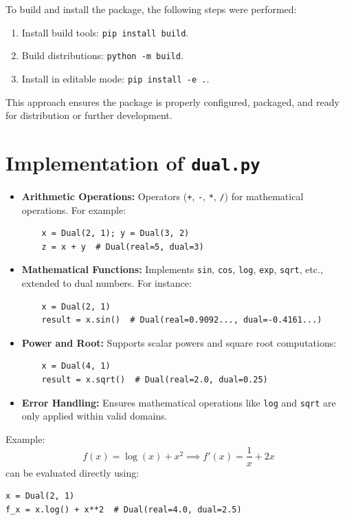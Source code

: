 \documentclass[a4paper,12pt]{article}
\begin{document}
To build and install the package, the following steps were performed:
\begin{enumerate}
    \item Install build tools: \texttt{pip install build}.
    \item Build distributions: \texttt{python -m build}.
    \item Install in editable mode: \texttt{pip install -e .}.
\end{enumerate}

This approach ensures the package is properly configured, packaged, and ready for distribution or further development.

\section{Implementation of \texttt{dual.py}}

\begin{itemize}
    \item \textbf{Arithmetic Operations:} Operators (\texttt{+}, \texttt{-}, \texttt{*}, \texttt{/}) for mathematical operations. For example:
    \begin{verbatim}
    x = Dual(2, 1); y = Dual(3, 2)
    z = x + y  # Dual(real=5, dual=3)
    \end{verbatim}
    \item \textbf{Mathematical Functions:} Implements \texttt{sin}, \texttt{cos}, \texttt{log}, \texttt{exp}, \texttt{sqrt}, etc., extended to dual numbers. For instance:
    \begin{verbatim}
    x = Dual(2, 1)
    result = x.sin()  # Dual(real=0.9092..., dual=-0.4161...)
    \end{verbatim}
    \item \textbf{Power and Root:} Supports scalar powers and square root computations:
    \begin{verbatim}
    x = Dual(4, 1)
    result = x.sqrt()  # Dual(real=2.0, dual=0.25)
    \end{verbatim}
    \item \textbf{Error Handling:} Ensures mathematical operations like \texttt{log} and \texttt{sqrt} are only applied within valid domains.
\end{itemize}

Example:
\[
f(x) = \log(x) + x^2 \implies f'(x) = \frac{1}{x} + 2x
\]
can be evaluated directly using:
\begin{verbatim}
x = Dual(2, 1)
f_x = x.log() + x**2  # Dual(real=4.0, dual=2.5)
\end{verbatim}
\end{document}
